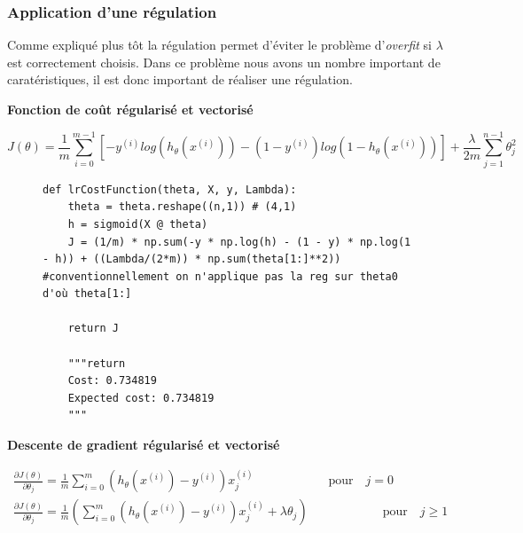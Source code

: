 \subsubsection{Application d'une régulation}

Comme expliqué plus tôt la régulation permet d'éviter le problème d'\textit{overfit} si $\lambda$ est correctement choisis. Dans ce problème nous avons un nombre important de caratéristiques, il est
donc important de réaliser une régulation.

\vspace{0.4cm}
\noindent
\textbf{Fonction de coût régularisé et vectorisé}

\begin{equation}\label{eq:cout-reg}
    J(\theta) = \frac{1}{m} \sum_{i=0}^{m-1}[-y^{(i)} log(h_\theta(x^{(i)})) - (1-y^{(i)}) log(1-h_\theta(x^{(i)}))] + \frac{\lambda}{2m} \sum_{j=1}^{n-1} \theta_j^2
\end{equation}

\begin{figure}[!h]
\begin{verbatim}
def lrCostFunction(theta, X, y, Lambda):
    theta = theta.reshape((n,1)) # (4,1)
    h = sigmoid(X @ theta)
    J = (1/m) * np.sum(-y * np.log(h) - (1 - y) * np.log(1 - h)) + ((Lambda/(2*m)) * np.sum(theta[1:]**2)) #conventionnellement on n'applique pas la reg sur theta0 d'où theta[1:]
        
    return J

    """return 
    Cost: 0.734819
    Expected cost: 0.734819
    """
\end{verbatim}   
\end{figure}


\vspace{0.4cm}
\noindent
\textbf{Descente de gradient régularisé et vectorisé}

\begin{align}\label{eq:descente-gradient-reg}
    \frac{\partial J(\theta)}{\partial \theta_j} = \frac{1}{m} \sum_{i=0}^{m} (h_\theta(x^{(i)}) - y^{(i)}) x_j^{(i)} \qquad \qquad \qquad \text{pour} \quad j=0 \\
    \frac{\partial J(\theta)}{\partial \theta_j} = \frac{1}{m} \left( \sum_{i=0}^{m} (h_\theta(x^{(i)}) - y^{(i)}) x_j^{(i)} + \lambda \theta_j \right) \qquad \qquad \qquad \text{pour} \quad j\geq1 
\end{align}

